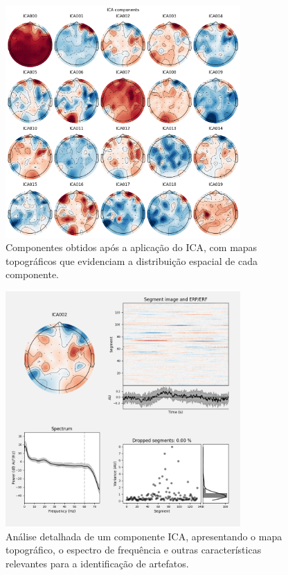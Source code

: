 \begin{figure}[htb]
    \centering
    \includegraphics[width=0.8\textwidth]{figs/1_preprocessamento_eeg/3_exemplo_compomentes_pos_ICA.png}
    \caption{Componentes obtidos após a aplicação do ICA, com mapas topográficos que evidenciam a distribuição espacial de cada componente.}
    \label{fig:componentes_pos_ICA}
\end{figure}

\begin{figure}[htb]
    \centering
    \includegraphics[width=0.8\textwidth]{figs/1_preprocessamento_eeg/4_exemplo_ICA_component_analysis.png}
    \caption{Análise detalhada de um componente ICA, apresentando o mapa topográfico, o espectro de frequência e outras características relevantes para a identificação de artefatos.}
    \label{fig:exemplo_ICA_component_analysis}
\end{figure}


